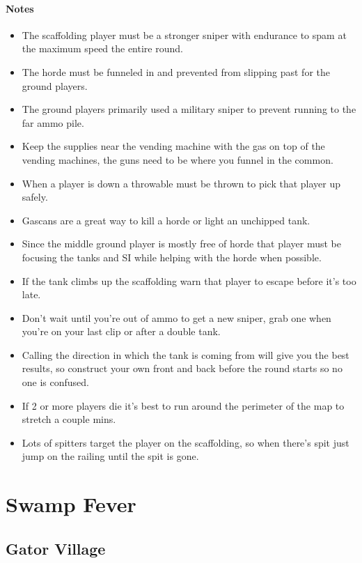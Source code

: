 \paragraph{Notes}
\begin{itemize}
\item The scaffolding player must be a stronger sniper with endurance to spam at the maximum speed the entire round.
\item The horde must be funneled in and prevented from slipping past for the ground players.
\item The ground players primarily used a military sniper to prevent running to the far ammo pile.
\item Keep the supplies near the vending machine with the gas on top of the vending machines, the guns need to be where you funnel in the common.
\item When a player is down a throwable must be thrown to pick that player up safely.
\item Gascans are a great way to kill a horde or light an unchipped tank. 
\item Since the middle ground player is mostly free of horde that player must be focusing the tanks and SI while helping with the horde when possible.
\item If the tank climbs up the scaffolding warn that player to escape before it’s too late.
\item Don’t wait until you’re out of ammo to get a new sniper, grab one when you’re on your last clip or after a double tank.
\item Calling the direction in which the tank is coming from will give you the best results, so construct your own front and back before the round starts so no one is confused.
\item If 2 or more players die it’s best to run around the perimeter of the map to stretch a couple mins.
\item Lots of spitters target the player on the scaffolding, so when there's spit just jump on the railing until the spit is gone.
\end{itemize}

\section{Swamp Fever}

\subsection{Gator Village}
